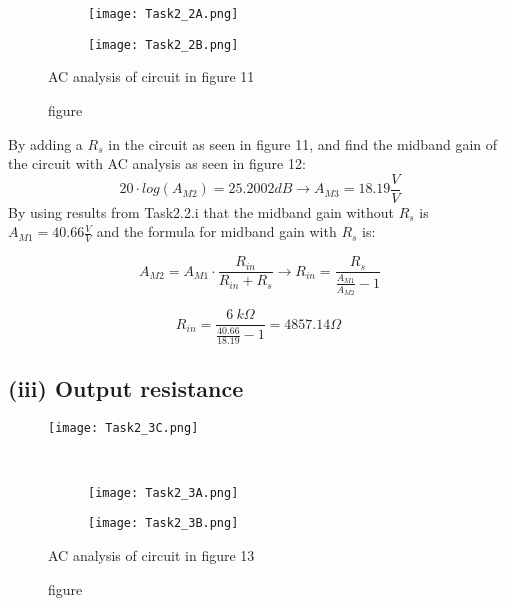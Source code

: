 	\begin{figure}[h]
        \centering
        \begin{subfigure}[h]{0.7\textwidth}
                \texttt{[image: Task2\_2A.png]}
                \label{fig:}
        \end{subfigure}
        \begin{subfigure}[h]{0.25\textwidth}
                \texttt{[image: Task2\_2B.png]}
                \label{fig:}
        \end{subfigure}
        \caption{figure}{AC analysis of circuit in figure 11}
	\end{figure}

	By adding a $R_{s}$ in the circuit as seen in figure 11,  and find the midband gain of the circuit with AC analysis as seen in figure 12:
	$$ 20 \cdot log(A_{M2}) = 25.2002 dB  \rightarrow A_{M3} = 18.19 \frac{V}{V} $$
	By using results from Task2.2.i that the midband gain without $R_{s}$ is $A_{M1} = 40.66 \frac{V}{V}$ and the formula for midband gain with $R_{s}$ is:

	$$ A_{M2} = A_{M1} \cdot \frac{R_{in}}{R_{in} + R_{s}} \rightarrow R_{in} = \frac{R_{s}}{\frac{A_{M1}}{A_{M2}}-1} $$
	
	$$R_{in} = \frac{6\ k \Omega}{\frac{40.66}{18.19}-1} = 4857.14 \Omega \ $$ 
	\pagebreak

 	\subsection*{(iii) Output resistance}

	\begin{figure}[h!]
	    \centering
	    \texttt{[image: Task2\_3C.png]}
	\end{figure}  \

	\begin{figure}[h]
	    \centering
	    \begin{subfigure}[h]{0.7\textwidth}
	            \texttt{[image: Task2\_3A.png]}
	            \label{fig:}
	    \end{subfigure}
	    \begin{subfigure}[h]{0.25\textwidth}
	            \texttt{[image: Task2\_3B.png]}
	            \label{fig:}
	    \end{subfigure}
	    \caption{figure}{AC analysis of circuit in figure 13}
	\end{figure}

